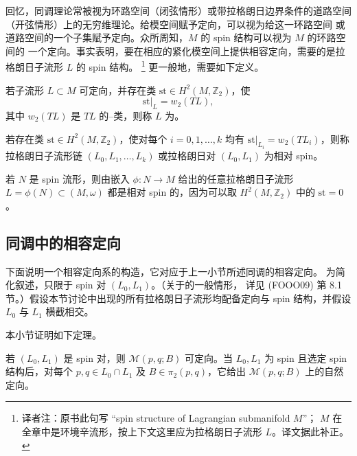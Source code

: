 回忆，\personFloer{}同调理论常被视为环路空间（闭弦情形）或带拉格朗日边界条件的道路空间
（开弦情形）上的无穷维\personMorse{}理论。给\personFloer{}模空间赋予定向，可以视为给这一环路空间
或道路空间的一个子集赋予定向。众所周知，$M$ 的 spin 结构可以视为 $M$ 的环路空间的
一个定向。事实表明，要在相应的紧化模空间上提供相容定向，需要的是拉格朗日子流形
$L$ 的 spin 结构。
\footnote{译者注：原书此句写 ``spin structure of Lagrangian submanifold $M$''；
$M$ 在全章中是环境辛流形，按上下文这里应为拉格朗日子流形 $L$。译文据此补正。}
更一般地，需要如下定义。

\begin{definition}
\label{def:relatively-spin-lagrangian-chain}
若子流形 $L\subset M$ 可定向，并存在类
$\mathrm{st}\in H^2(M,\mathbb Z_2)$，使
\[
 \mathrm{st}|_L=w_2(TL),
\]
其中 $w_2(TL)$ 是 $TL$ 的\personStiefel{}--\personWhitney{}类，则称 $L$ 为\termRelativelySpin{}。

若存在类 $\mathrm{st}\in H^2(M,\mathbb Z_2)$，使对每个
$i=0,1,\ldots,k$ 均有
$\mathrm{st}|_{L_i}=w_2(TL_i)$，则称拉格朗日子流形链
$(L_0,L_1,\ldots,L_k)$ 或拉格朗日对 $(L_0,L_1)$ 为相对 spin。
\end{definition}

若 $N$ 是 spin 流形，则由嵌入 $\phi:N\to M$ 给出的任意拉格朗日子流形
$L=\phi(N)\subset(M,\omega)$ 都是相对 spin 的，因为可以取
$H^2(M,\mathbb Z_2)$ 中的 $\mathrm{st}=0$。

\subsection{\personFloer{}同调中的相容定向}
\label{subsec:coherent-orientations-floer-homology}

下面说明一个相容定向系的构造，它对应于上一小节所述\personMorse{}同调的相容定向。
为简化叙述，只限于 spin 对 $(L_0,L_1)$。（关于\termRelativeSpinStructure{}的一般情形，
详见 (FOOO09) 第 8.1 节。）假设本节讨论中出现的所有拉格朗日子流形均配备定向与
spin 结构，并假设 $L_0$ 与 $L_1$ 横截相交。

本小节证明如下定理。

\begin{theorem}
\label{thm:spin-pair-orients-floer-moduli}
若 $(L_0,L_1)$ 是 spin 对，则 $\mathcal M(p,q;B)$ 可定向。当 $L_0,L_1$
为 spin 且选定 spin 结构后，对每个 $p,q\in L_0\cap L_1$ 及
$B\in\pi_2(p,q)$，它给出 $\mathcal M(p,q;B)$ 上的自然定向。
\end{theorem}

